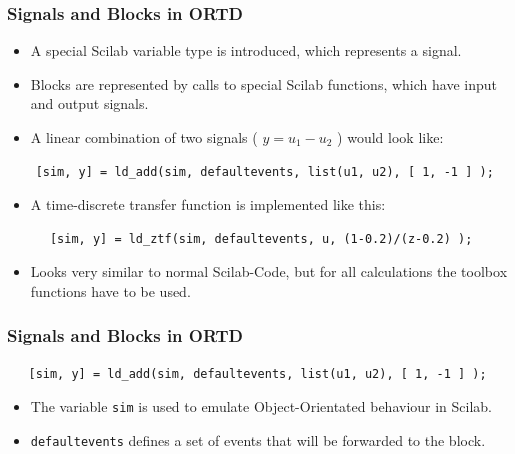 \documentclass[serif,9pt,xcolor=dvipsnames]{beamer}
\begin{document}
\begin{frame}[fragile]
    \frametitle{Signals and Blocks in ORTD}

  \begin{itemize}
  \item A special Scilab variable type is introduced, which represents a signal.
  \item Blocks are represented by calls to special Scilab functions, which have input and output signals.
  \end{itemize}

  \begin{itemize}
  \item A linear combination of two signals ( $y=u_1 - u_2$ ) would look like:
  \end{itemize}


  {\small 
  \begin{lstlisting}
    [sim, y] = ld_add(sim, defaultevents, list(u1, u2), [ 1, -1 ] );
  \end{lstlisting}}
    

  \begin{itemize}
  \item A time-discrete transfer function is implemented like this:
  \end{itemize}

  {\small 
  \begin{lstlisting} 
      [sim, y] = ld_ztf(sim, defaultevents, u, (1-0.2)/(z-0.2) );
  \end{lstlisting}}


  \begin{itemize}
  \item Looks very similar to normal Scilab-Code, but for all calculations the toolbox functions have to be used.
  \end{itemize}
  


\end{frame}




\begin{frame}[fragile]
\frametitle{Signals and Blocks in ORTD}
 
 
{\small 
\begin{lstlisting}
   [sim, y] = ld_add(sim, defaultevents, list(u1, u2), [ 1, -1 ] );
\end{lstlisting}}
 
 \begin{itemize}
  \item The variable \texttt{sim} is used to emulate Object-Orientated behaviour in Scilab.
\item \texttt{defaultevents} defines a set of events that will be forwarded to the block.
 \end{itemize}

 
\end{frame}
\end{document}

